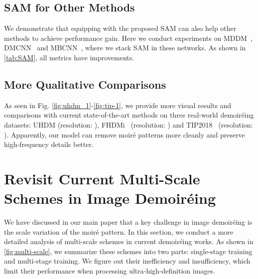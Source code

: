 \documentclass[runningheads]{llncs}
\begin{document}
\subsection{SAM for Other Methods}
We demonstrate that equipping with the proposed SAM can also help other methods to achieve performance gain. Here we conduct experiments on MDDM~\cite{cheng2019multi}, DMCNN~\cite{sun2018moire} and MBCNN~\cite{zheng2020image}, where we stack SAM in these networks. As shown in \cref{tab:SAM}, all metrics have improvements.   

\begin{table}[H]
\caption{Effects of the proposed SAM. We add our SAM to current methods DMCNN~\cite{sun2018moire}, MDDM~\cite{cheng2019multi} and MBCNN~\cite{zheng2020image} to improve their performances}
\centering
{}

\label{tab:SAM}
\end{table}


\subsection{More Qualitative Comparisons}
As seen in Fig. \ref{fig:uhdm_1}-\ref{fig:tip-1}, we provide more visual results and comparisons with current state-of-the-art methods on three real-world demoiréing datasets: UHDM (resolution: ), FHDMi~\cite{he2020fhde} (resolution: ) and TIP2018~\cite{sun2018moire} (resolution: ). Apparently, our model can remove moiré patterns more cleanly and preserve high-frequency details better.


\section{Revisit Current Multi-Scale Schemes in Image Demoiréing}
\label{sec:revisit}
We have discussed in our main paper that a key challenge in image demoiréing is the scale variation of the moiré pattern. In this section, we conduct a more detailed analysis of multi-scale schemes in current demoiréing works.
As shown in \cref{fig:multi-scale}, we summarize these schemes into two parts: single-stage training and multi-stage training. We figure out their inefficiency and insufficiency, which limit their performance when processing ultra-high-definition images. 
\end{document}
